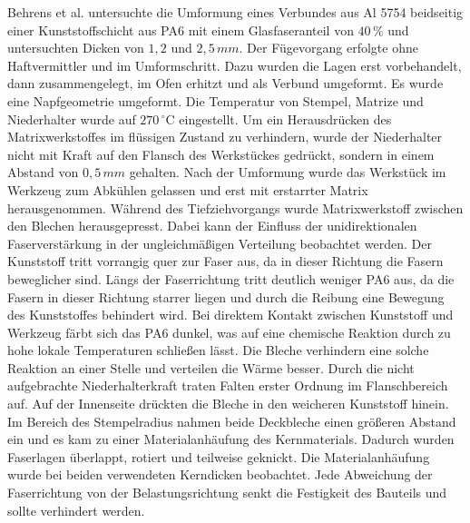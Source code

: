 Behrens et al. \cite{Behrens.2014} untersuchte die Umformung eines Verbundes aus Al 5754 beidseitig einer Kunststoffschicht aus PA6 mit einem Glasfaseranteil von $40\,\%$ und untersuchten Dicken von $1,2$ und $2,5 \, mm$.
Der Fügevorgang erfolgte ohne Haftvermittler und im Umformschritt. Dazu wurden die Lagen erst vorbehandelt, dann zusammengelegt, im Ofen erhitzt und als Verbund umgeformt.
Es wurde eine Napfgeometrie umgeformt.
Die Temperatur von Stempel, Matrize und Niederhalter wurde auf $270 \, ^\circ \text{C}$ eingestellt.
Um ein Herausdrücken des Matrixwerkstoffes im flüssigen Zustand zu verhindern, wurde der Niederhalter nicht mit Kraft auf den Flansch des Werkstückes gedrückt, sondern in einem Abstand von $0,5\,mm$ gehalten.
Nach der Umformung wurde das Werkstück im Werkzeug zum Abkühlen gelassen und erst mit erstarrter Matrix herausgenommen.
Während des Tiefziehvorgangs wurde Matrixwerkstoff zwischen den Blechen herausgepresst.
Dabei kann der Einfluss der unidirektionalen Faserverstärkung in der ungleichmäßigen Verteilung beobachtet werden.
Der Kunststoff tritt vorrangig quer zur Faser aus, da in dieser Richtung die Fasern beweglicher sind.
Längs der Faserrichtung tritt deutlich weniger PA6 aus, da die Fasern in dieser Richtung starrer liegen und durch die Reibung eine Bewegung des Kunststoffes behindert wird.
Bei direktem Kontakt zwischen Kunststoff und Werkzeug färbt sich das PA6 dunkel, was auf eine chemische Reaktion durch zu hohe lokale Temperaturen schließen lässt.
Die Bleche verhindern eine solche Reaktion an einer Stelle und verteilen die Wärme besser.
Durch die nicht aufgebrachte Niederhalterkraft traten Falten erster Ordnung im Flanschbereich auf.
Auf der Innenseite drückten die Bleche in den weicheren Kunststoff hinein.
Im Bereich des Stempelradius nahmen beide Deckbleche einen größeren Abstand ein und es kam zu einer Materialanhäufung des Kernmaterials.
Dadurch wurden Faserlagen überlappt, rotiert und teilweise geknickt.
Die Materialanhäufung wurde bei beiden verwendeten Kerndicken beobachtet.
Jede Abweichung der Faserrichtung von der Belastungsrichtung senkt die Festigkeit des Bauteils und sollte verhindert werden.

